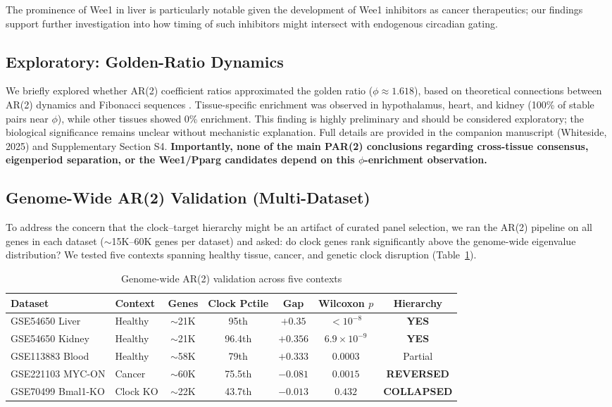 \documentclass[11pt,a4paper]{article}
\begin{document}
The prominence of Wee1 in liver is particularly notable given the development of Wee1 inhibitors as cancer therapeutics; our findings support further investigation into how timing of such inhibitors might intersect with endogenous circadian gating.

\subsection{Exploratory: Golden-Ratio Dynamics}

We briefly explored whether AR(2) coefficient ratios approximated the golden ratio ($\phi \approx 1.618$), based on theoretical connections between AR(2) dynamics and Fibonacci sequences \citep{boman2025fibonacci}. Tissue-specific enrichment was observed in hypothalamus, heart, and kidney (100\% of stable pairs near $\phi$), while other tissues showed 0\% enrichment. This finding is highly preliminary and should be considered exploratory; the biological significance remains unclear without mechanistic explanation. Full details are provided in the companion manuscript (Whiteside, 2025) and Supplementary Section S4. \textbf{Importantly, none of the main PAR(2) conclusions regarding cross-tissue consensus, eigenperiod separation, or the Wee1/Pparg candidates depend on this $\phi$-enrichment observation.}

\subsection{Genome-Wide AR(2) Validation (Multi-Dataset)}

To address the concern that the clock--target hierarchy might be an artifact of curated panel selection, we ran the AR(2) pipeline on all genes in each dataset ($\sim$15K--60K genes per dataset) and asked: do clock genes rank significantly above the genome-wide eigenvalue distribution? We tested five contexts spanning healthy tissue, cancer, and genetic clock disruption (Table~\ref{tab:genomewide}).

\begin{table}[H]
\centering
\caption{Genome-wide AR(2) validation across five contexts}
\label{tab:genomewide}
\begin{tabular}{p{3cm}lccccc}
\toprule
Dataset & Context & Genes & Clock Pctile & Gap & Wilcoxon $p$ & Hierarchy \\
\midrule
GSE54650 Liver & Healthy & $\sim$21K & 95th & $+0.35$ & $<10^{-8}$ & \textbf{YES} \\
GSE54650 Kidney & Healthy & $\sim$21K & 96.4th & $+0.356$ & $6.9\times10^{-9}$ & \textbf{YES} \\
GSE113883 Blood & Healthy & $\sim$58K & 79th & $+0.333$ & $0.0003$ & Partial \\
GSE221103 MYC-ON & Cancer & $\sim$60K & 75.5th & $-0.081$ & $0.0015$ & \textbf{REVERSED} \\
GSE70499 Bmal1-KO & Clock KO & $\sim$22K & 43.7th & $-0.013$ & $0.432$ & \textbf{COLLAPSED} \\
\bottomrule
\end{tabular}
\end{table}
\end{document}
